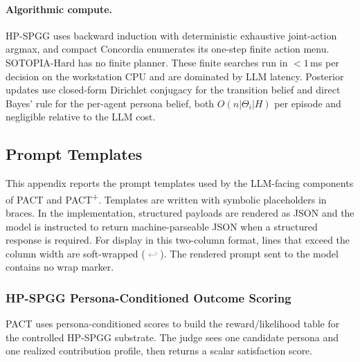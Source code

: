 \paragraph{Algorithmic compute.} HP-SPGG uses backward induction with deterministic exhaustive joint-action argmax, and compact Concordia enumerates its one-step finite action menu. SOTOPIA-Hard has no finite planner. These finite searches run in $<1$\,ms per decision on the workstation CPU and are dominated by LLM latency. Posterior updates use closed-form Dirichlet conjugacy for the transition belief and direct Bayes' rule for the per-agent persona belief, both $O(n|\Theta_i|H)$ per episode and negligible relative to the LLM cost.



\subsection{Prompt Templates}
\label{app:prompt-templates}

This appendix reports the prompt templates used by the LLM-facing components of
PACT and PACT\textsuperscript{+}. Templates are written with symbolic placeholders in braces. In
the implementation, structured payloads are rendered as JSON and the model is
instructed to return machine-parseable JSON when a structured response is
required. For display in this two-column format, lines that exceed the column
width are soft-wrapped (\textcolor{gray}{$\hookleftarrow$}). The rendered prompt
sent to the model contains no wrap marker.


\subsubsection{HP-SPGG Persona-Conditioned Outcome Scoring}
\label{app:prompt-hp-spgg-scoring}

PACT uses persona-conditioned scores to build the reward/likelihood table for
the controlled HP-SPGG substrate. The judge sees one candidate persona and one
realized contribution profile, then returns a scalar satisfaction score.

